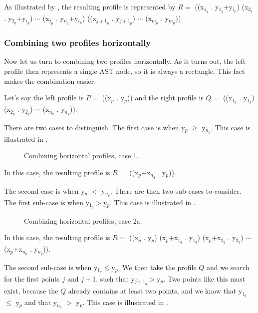 As illustrated by , the resulting
profile is represented by $R = $ ((x$_{1_q}$ . y$_{1_q}$$+$y$_{i_p}$)
(x$_{2_q}$ . y$_{2_q}$$+$y$_{i_p}$) $\cdots$ (x$_{j_p}$
. y$_{n_q}$$+$y$_{i_p}$) ((x$_{{j+1}_p}$ . y$_{{j+1}_p}$) $\cdots$
(x$_{m_p}$ . y$_{m_p}$)).

\subsubsection{Combining two profiles horizontally}

Now let us turn to combining two profiles horizontally.  As it turns
out, the left profile then represents a single AST node, so it is
always a rectangle.  This fact makes the combination easier.

Let's say the left profile is $P = $ ((x$_p$ . y$_p$)) and the right
profile is $Q = $ ((x$_{1_q}$ . y$_{1_q}$) (x$_{2_q}$ . y$_{2_q}$)
$\cdots$ (x$_{n_q}$ . y$_{n_q}$)).

There are two cases to distinguish.  The first case is when y$_p$ $\ge$
y$_{n_q}$.  This case is illustrated in
.

\begin{figure}
\begin{center}
\end{center}
\caption{\label{fig-profile-horizontal-case-1}
Combining horizontal profiles, case 1.}
\end{figure}

In this case, the resulting profile is $R = $ ((x$_p$$+$x$_{n_q}$ . y$_p$)).

The second case is when y$_p$ $<$ y$_{n_q}$.  There are then two
sub-cases to consider.  The first sub-case is when y$_{1_q}$$>$y$_p$.
This case is illustrated in .

\begin{figure}
\begin{center}
\end{center}
\caption{\label{fig-profile-horizontal-case-2a}
Combining horizontal profiles, case 2a.}
\end{figure}

In this case, the resulting profile is $R = $ ((x$_p$ . y$_p$)
(x$_p$$+$x$_{1_q}$ . y$_{1_q}$) (x$_p$$+$x$_{2_q}$ . y$_{2_q}$)
$\cdots$ (x$_p$$+$x$_{n_q}$ . y$_{n_q}$)).

The second sub-case is when y$_{1_q}$$\le$y$_p$.  We then take the
profile $Q$ and we search for the first points $j$ and $j+1$, such
that y$_{{j+1}_q}$$>$y$_p$.  Two points like this must exist, because
the $Q$ already contains at least two points, and we know that
y$_{1_q}$ $\le$ y$_p$ and that y$_{n_q}$ $>$ y$_p$.
This case is illustrated in .

